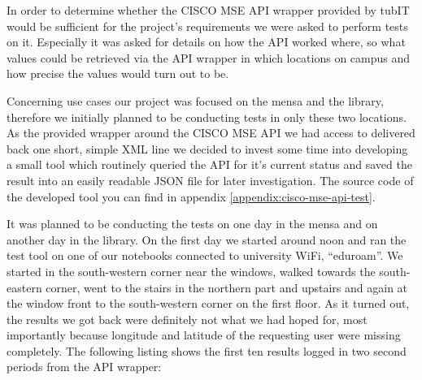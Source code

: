 In order to determine whether the CISCO MSE API wrapper provided by tubIT would be sufficient for the project's requirements we were asked to perform tests on it. Especially it was asked for details on how the API worked where, so what values could be retrieved via the API wrapper in which locations on campus and how precise the values would turn out to be.

Concerning use cases our project was focused on the mensa and the library, therefore we initially planned to be conducting tests in only these two locations. As the provided wrapper around the CISCO MSE API we had access to delivered back one short, simple XML line we decided to invest some time into developing a small tool which routinely queried the API for it's current status and saved the result into an easily readable JSON file for later investigation. The source code of the developed tool you can find in appendix \ref{appendix:cisco-mse-api-test}.

It was planned to be conducting the tests on one day in the mensa and on another day in the library. On the first day we started around noon and ran the test tool on one of our notebooks connected to university WiFi, \enquote{eduroam}. We started in the south-western corner near the windows, walked towards the south-eastern corner, went to the stairs in the northern part and upstairs and again at the window front to the south-western corner on the first floor. As it turned out, the results we got back were definitely not what we had hoped for, most importantly because longitude and latitude of the requesting user were missing completely. The following listing shows the first ten results logged in two second periods from the API wrapper:

